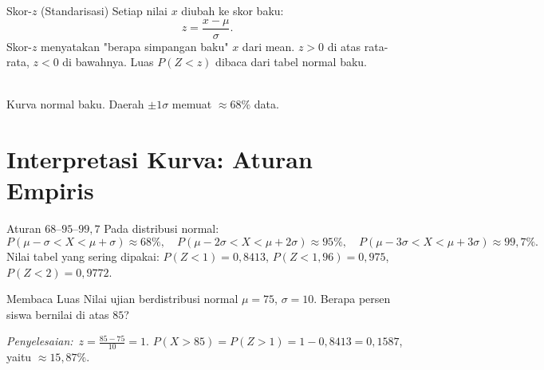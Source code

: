 \documentclass[11pt,a4paper]{report}
\theoremstyle{gaya}
\newcommand{\jawab}{\par\smallskip\noindent\textit{\textcolor{oranye}{Penyelesaian:}}\ }
\begin{document}
\begin{konsep}{Skor-$z$ (Standarisasi)}
Setiap nilai $x$ diubah ke skor baku:
\[
z=\frac{x-\mu}{\sigma}.
\]
Skor-$z$ menyatakan "berapa simpangan baku" $x$ dari mean. $z>0$ di atas rata-rata, $z<0$ di bawahnya. Luas $P(Z<z)$ dibaca dari tabel normal baku.
\end{konsep}

\begin{center}
\\
\small Kurva normal baku. Daerah $\pm1\sigma$ memuat $\approx68\%$ data.
\end{center}

\section{Interpretasi Kurva: Aturan Empiris}
\begin{konsep}{Aturan $68$--$95$--$99{,}7$}
Pada distribusi normal:
\[
P(\mu-\sigma<X<\mu+\sigma)\approx68\%,\quad
P(\mu-2\sigma<X<\mu+2\sigma)\approx95\%,\quad
P(\mu-3\sigma<X<\mu+3\sigma)\approx99{,}7\%.
\]
Nilai tabel yang sering dipakai: $P(Z<1)=0{,}8413$, $P(Z<1{,}96)=0{,}975$, $P(Z<2)=0{,}9772$.
\end{konsep}

\begin{contoh}{Membaca Luas}
Nilai ujian berdistribusi normal $\mu=75$, $\sigma=10$. Berapa persen siswa bernilai di atas $85$?

\jawab $z=\tfrac{85-75}{10}=1$. $P(X>85)=P(Z>1)=1-0{,}8413=0{,}1587$, yaitu $\approx15{,}87\%$.
\end{contoh}
\end{document}
